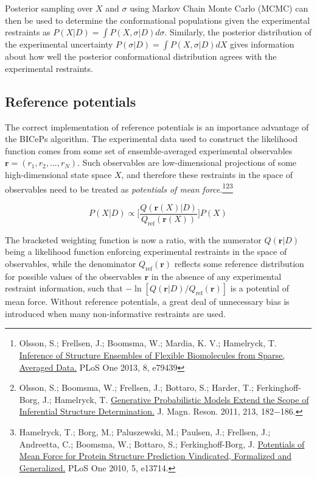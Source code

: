 \documentclass[11pt]{article}
\begin{document}
Posterior sampling over \(X\) and \(\sigma\) using Markov Chain Monte
Carlo (MCMC) can then be used to determine the conformational
populations given the experimental restraints as
\(P(X|D) = \int P(X,\sigma | D) d\sigma\). Similarly, the posterior
distribution of the experimental uncertainty
\(P(\sigma | D) = \int P(X,\sigma | D) dX\) gives information about how
well the posterior conformational distribution agrees with the
experimental restraints.

\hypertarget{reference-potentials}{%
\subsection{Reference potentials}\label{reference-potentials}}

The correct implementation of reference potentials is an importance
advantage of the BICePs algorithm. The experimental data used to
construct the likelihood function comes from some set of
ensemble-averaged experimental observables
\(\mathbf{r} = (r_1, r_2, ..., r_N)\). Such observables are
low-dimensional projections of some high-dimensional state space \(X\),
and therefore these restraints in the space of observables need to be
treated as \emph{potentials of mean force}.\footnote{Olsson, S.;
  Frellsen, J.; Boomsma, W.; Mardia, K. V.; Hamelryck, T.
  \href{http://journals.plos.org/plosone/article?id=10.1371/journal.pone.0079439}{Inference
  of Structure Ensembles of Flexible Biomolecules from Sparse, Averaged
  Data.} PLoS One 2013, 8, e79439}\footnote{Olsson, S.; Boomsma, W.;
  Frellsen, J.; Bottaro, S.; Harder, T.; Ferkinghoff-Borg, J.;
  Hamelryck, T.
  \href{https://www.sciencedirect.com/science/article/pii/S1090780711003090?via\%3Dihub}{Generative
  Probabilistic Models Extend the Scope of Inferential Structure
  Determination.} J. Magn. Reson. 2011, 213, 182−186.}\footnote{Hamelryck,
  T.; Borg, M.; Paluszewski, M.; Paulsen, J.; Frellsen, J.; Andreetta,
  C.; Boomsma, W.; Bottaro, S.; Ferkinghoff-Borg, J.
  \href{http://journals.plos.org/plosone/article?id=10.1371/journal.pone.0013714}{Potentials
  of Mean Force for Protein Structure Prediction Vindicated, Formalized
  and Generalized.} PLoS One 2010, 5, e13714.}

\[P(X | D) \propto \bigg[ \frac{Q(\mathbf{r}(X)|D)}{Q_{\text{ref}}(\mathbf{r}(X))} \bigg] P(X)\tag{3}\]

The bracketed weighting function is now a ratio, with the numerator
\(Q(\mathbf{r}|D)\) being a likelihood function enforcing experimental
restraints in the space of observables, while the denominator
\(Q_{\text{ref}}(\mathbf{r})\) reflects some reference distribution for
possible values of the observables \(\mathbf{r}\) in the absence of any
experimental restraint information, such that
\(-\ln [Q(\mathbf{r}|D)/Q_{\text{ref}}(\mathbf{r})]\) is a potential of
mean force. Without reference potentials, a great deal of unnecessary
bias is introduced when many non-informative restraints are used.
\end{document}
